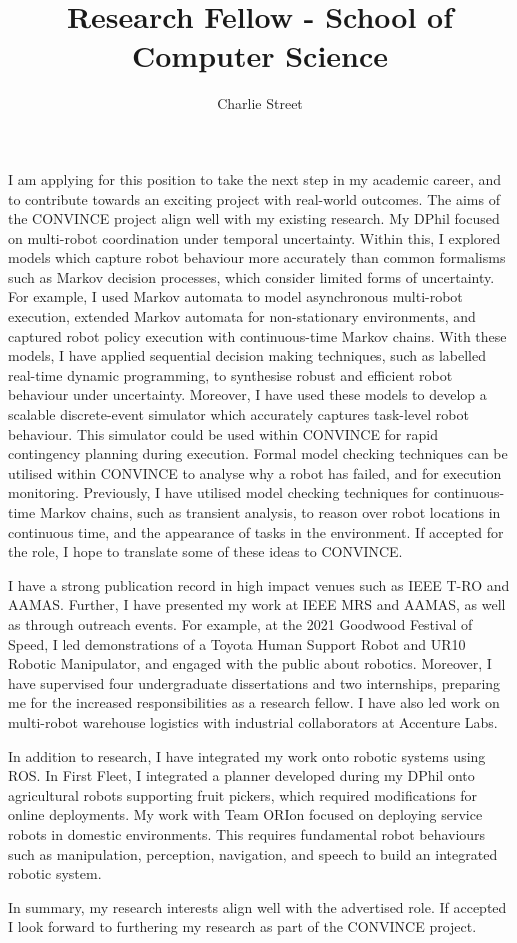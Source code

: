 \documentclass[12pt]{article}
\title{Research Fellow - School of Computer Science}
\date{}
\author{Charlie Street}
\begin{document}
\maketitle
\thispagestyle{empty}


I am applying for this position to take the next step in my academic career, and to contribute towards an exciting project with real-world outcomes.
%
The aims of the CONVINCE project align well with my existing research.
%
My DPhil focused on multi-robot coordination under temporal uncertainty.
%
Within this, I explored models which capture robot behaviour more accurately than common formalisms such as Markov decision processes, which consider limited forms of uncertainty.
%
For example, I used Markov automata to model asynchronous multi-robot execution, extended Markov automata for non-stationary environments, and captured robot policy execution with continuous-time Markov chains.
%
With these models, I have applied sequential decision making techniques, such as labelled real-time dynamic programming, to synthesise robust and efficient robot behaviour under uncertainty.
%
Moreover, I have used these models to develop a scalable discrete-event simulator which accurately captures task-level robot behaviour.
%
This simulator could be used within CONVINCE for rapid contingency planning during execution.
%
Formal model checking techniques can be utilised within CONVINCE to analyse why a robot has failed, and for execution monitoring.
%
Previously, I have utilised model checking techniques for continuous-time Markov chains, such as transient analysis, to reason over robot locations in continuous time, and the appearance of tasks in the environment.
%
If accepted for the role, I hope to translate some of these ideas to CONVINCE.

I have a strong publication record in high impact venues such as IEEE T-RO and AAMAS.
%
Further, I have presented my work at IEEE MRS and AAMAS, as well as through outreach events.
%
For example, at the 2021 Goodwood Festival of Speed, I led demonstrations of a Toyota Human Support Robot and UR10 Robotic Manipulator, and engaged with the public about robotics.
%
Moreover, I have supervised four undergraduate dissertations and two internships, preparing me for the increased responsibilities as a research fellow.
%
I have also led work on multi-robot warehouse logistics with industrial collaborators at Accenture Labs.

In addition to research, I have integrated my work onto robotic systems using ROS.
%
In First Fleet, I integrated a planner developed during my DPhil onto agricultural robots supporting fruit pickers, which required modifications for online deployments.
%
My work with Team ORIon focused on deploying service robots in domestic environments.
%
This requires fundamental robot behaviours such as manipulation, perception, navigation, and speech to build an integrated robotic system.

In summary, my research interests align well with the advertised role. 
%
If accepted I look forward to furthering my research as part of the CONVINCE project.
\end{document}
